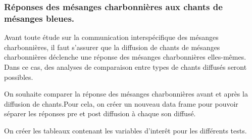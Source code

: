\documentclass[
  french,
]{article}
\newenvironment{Shaded}{\begin{snugshade}}{\end{snugshade}}
\newcommand{\AttributeTok}[1]{\textcolor[rgb]{0.13,0.29,0.53}{#1}}
\newcommand{\CommentTok}[1]{\textcolor[rgb]{0.56,0.35,0.01}{\textit{#1}}}
\newcommand{\FunctionTok}[1]{\textcolor[rgb]{0.13,0.29,0.53}{\textbf{#1}}}
\newcommand{\NormalTok}[1]{#1}
\newcommand{\OtherTok}[1]{\textcolor[rgb]{0.56,0.35,0.01}{#1}}
\newcommand{\SpecialCharTok}[1]{\textcolor[rgb]{0.81,0.36,0.00}{\textbf{#1}}}
\newcommand{\StringTok}[1]{\textcolor[rgb]{0.31,0.60,0.02}{#1}}
\begin{document}
\subsubsection{Réponses des mésanges charbonnières aux chants de
mésanges
bleues.}\label{ruxe9ponses-des-muxe9sanges-charbonniuxe8res-aux-chants-de-muxe9sanges-bleues.}

Avant toute étude sur la communication interspécifique des mésanges
charbonnières, il faut s'assurer que la diffusion de chants de mésanges
charbonnières déclenche une réponse des mésanges charbonnières
elles-mêmes. Dans ce cas, des analyses de comparaison entre types de
chants diffusés seront possibles.

On souhaite comparer la réponse des mésanges charbonnières avant et
après la diffusion de chants.Pour cela, on créer un nouveau data frame
pour pouvoir séparer les réponses pre et post diffusion à chaque son
diffusé.

\begin{Shaded}
\end{Shaded}

On créer les tableaux contenant les variables d'interêt pour les
différents tests.
\end{document}
